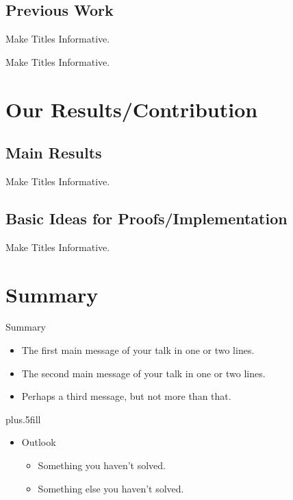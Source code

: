 \documentclass{beamer}
\begin{document}
\subsection{Previous Work}

\begin{frame}{Make Titles Informative.}
\end{frame}

\begin{frame}{Make Titles Informative.}
\end{frame}

\section{Our Results/Contribution}

\subsection{Main Results}

\begin{frame}{Make Titles Informative.}
\end{frame}

\subsection{Basic Ideas for Proofs/Implementation}

\begin{frame}{Make Titles Informative.}
\end{frame}

\section*{Summary}

\begin{frame}{Summary}
  \begin{itemize}
  \item
    The \alert{first main message} of your talk in one or two lines.
  \item
    The \alert{second main message} of your talk in one or two lines.
  \item
    Perhaps a \alert{third message}, but not more than that.
  \end{itemize}

  \vskip0pt plus.5fill
  \begin{itemize}
  \item
    Outlook
    \begin{itemize}
    \item
      Something you haven't solved.
    \item
      Something else you haven't solved.
    \end{itemize}
  \end{itemize}
\end{frame}
\end{document}
